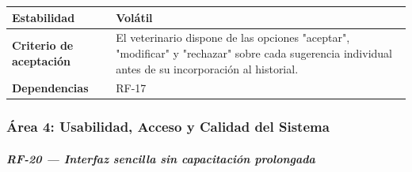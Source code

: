 \documentclass[
]{article}
\newcounter{none} %
\begin{document}
{\def\LTcaptype{none} %
\begin{longtable}[]{@{}
  >{\raggedright\arraybackslash}p{}
  >{\raggedright\arraybackslash}p{}@{}}
\toprule\noalign{}
\begin{minipage}[b]{\linewidth}\raggedright
\textbf{Estabilidad}
\end{minipage} & \begin{minipage}[b]{\linewidth}\raggedright
Volátil
\end{minipage} \\
\midrule\noalign{}
\endhead
\bottomrule\noalign{}
\endlastfoot
\textbf{Criterio de aceptación} &
\begin{minipage}[t]{\linewidth}\raggedright
El veterinario dispone de las opciones "aceptar", "modificar" y
"rechazar" sobre cada sugerencia individual antes de su incorporación al
historial.
\end{minipage} \\
\textbf{Dependencias} & \begin{minipage}[t]{\linewidth}\raggedright
RF-17
\end{minipage} \\
\end{longtable}
}

\subsubsection{Área 4: Usabilidad, Acceso y Calidad del
Sistema}\label{uxe1rea-4-usabilidad-acceso-y-calidad-del-sistema}

\subparagraph{RF-20 --- Interfaz sencilla sin capacitación
prolongada}\label{rf-20-interfaz-sencilla-sin-capacitaciuxf3n-prolongada}
\end{document}
